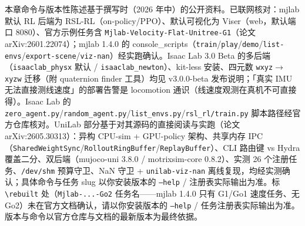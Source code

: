 \begin{finenote}
本章命令与版本性陈述基于撰写时（2026 年中）的公开资料。已联网核对：mjlab 默认 RL 后端为 RSL-RL（on-policy/PPO）、默认可视化为 Viser（web，默认端口 8080）、官方示例任务含 \texttt{Mjlab-Velocity-Flat-Unitree-G1}（论文 arXiv:2601.22074）；mjlab 1.4.0 的 console\_scripts（\texttt{train}/\allowbreak\texttt{play}/\allowbreak\texttt{demo}/\allowbreak\texttt{list-envs}/\allowbreak\texttt{export-scene}/\allowbreak\texttt{viz-nan}）经实跑确认。Isaac Lab 3.0 Beta 的多后端（\texttt{isaaclab\_physx} 默认 / \texttt{isaaclab\_newton}）、kit-less 安装、四元数 \texttt{wxyz}$\to$\texttt{xyzw} 迁移（附 quaternion finder 工具）均见 v3.0.0-beta 发布说明；「真实 IMU 无法直接测线速度」的部署告警是 locomotion 通识（线速度观测在真机不可直接得）。Isaac Lab 的 \texttt{zero\_agent.\allowbreak py}/\allowbreak\texttt{random\_agent.\allowbreak py}/\allowbreak\texttt{list\_envs.\allowbreak py}/\allowbreak\texttt{rsl\_rl/\allowbreak train.\allowbreak py} 脚本路径经官方仓库核对。UniLab 部分基于对其源码的直接阅读与实跑（论文 arXiv:2605.30313）：异构 CPU-sim + GPU-policy 架构、共享内存 IPC（\texttt{SharedWeightSync}/\allowbreak\texttt{RolloutRingBuffer}/\allowbreak\texttt{ReplayBuffer}）、CLI 路由键 vs Hydra 覆盖二分、双后端（mujoco-uni 3.8.0 / motrixsim-core 0.8.2）、实测 26 个注册任务、\texttt{/dev/shm} 预算守卫、NaN 守卫 + \texttt{unilab-viz-nan} 离线复现，均经实测确认；具体命令与任务 slug 以你安装版本的 \texttt{--help} / 注册表实际输出为准。标 \texttt{\textbackslash rebuilt} 处（\texttt{Mjlab-...-Go2} 任务名——mjlab 1.4.0 只有 G1/Go1 速度任务、无 Go2）未在官方文档确认，请以你安装版本的 \texttt{--help} / 任务注册表实际输出为准。版本与命令以官方仓库与文档的最新版本为最终依据。
\end{finenote}
